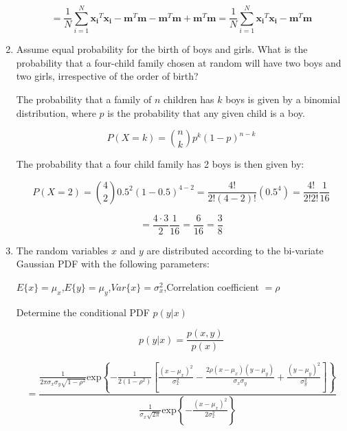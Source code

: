 \documentclass[fleqn]{article}
\begin{document}
\begin{enumerate}
		\begin{equation*}
			 = \frac{1}{N}\sum_{i=1}^{N}{\mathbf{x_i}^T\mathbf{x_i}}-\mathbf{m}^T\mathbf{m}-\mathbf{m}^T\mathbf{m}+\mathbf{m}^T\mathbf{m} = \frac{1}{N}\sum_{i=1}^{N}{\mathbf{x_i}^T\mathbf{x_i}}-\mathbf{m}^T\mathbf{m}
		\end{equation*}
		
		\item Assume equal probability for the birth of boys and girls. What is the probability that a four-child family chosen at random will have two boys and two girls, irrespective of the order of birth?
		
		The probability that a family of $n$ children has $k$ boys is given by a binomial distribution, where $p$ is the probability that any given child is a boy.
		 
		\begin{equation*}
			P(X = k) = \binom{n}{k}p^k(1-p)^{n-k}
		\end{equation*}
		
		The probability that a four child family has 2 boys is then given by:
		
		\begin{equation*}
			P(X = 2) = \binom{4}{2}0.5^2(1-0.5)^{4-2} = \frac{4!}{2!(4-2)!}(0.5^4) = \frac{4!}{2!2!}\frac{1}{16} 
		\end{equation*}
		
		\begin{equation*}
			= \frac{4 \cdot 3}{2}\frac{1}{16} = \frac{6}{16} = \frac{3}{8}
		\end{equation*}
		
		\item The random variables $x$ and $y$ are distributed according to the bi-variate Gaussian PDF with the following parameters:
		
		$E\{x\} = \mu_x$,\quad$E\{y\} = \mu_y$,\quad$Var\{x\} = \sigma_x^2$,\quad Correlation coefficient $ = \rho$
		
		Determine the conditional PDF $p(y|x)$
		
		\begin{equation*}		
			p(y|x) = \frac{p(x,y)}{p(x)}
		\end{equation*}
		
		\begin{equation*}
			 = \frac{\frac{1}{2\pi\sigma_x\sigma_y\sqrt{1-\rho^2}}\text{exp}\left\{-\frac{1}{2(1-\rho^2)}\left[\frac{(x-\mu_x)^2}{\sigma_x^2}-\frac{2\rho(x-\mu_x)(y-\mu_y)}{\sigma_x\sigma_y}+\frac{(y-\mu_y)^2}{\sigma_y^2}\right]\right\}}{\frac{1}{\sigma_x\sqrt{2\pi}}\text{exp}\left\{-\frac{(x-\mu_x)^2}{2\sigma_x^2}\right\}}
		\end{equation*}
		

\end{enumerate}
\end{document}
